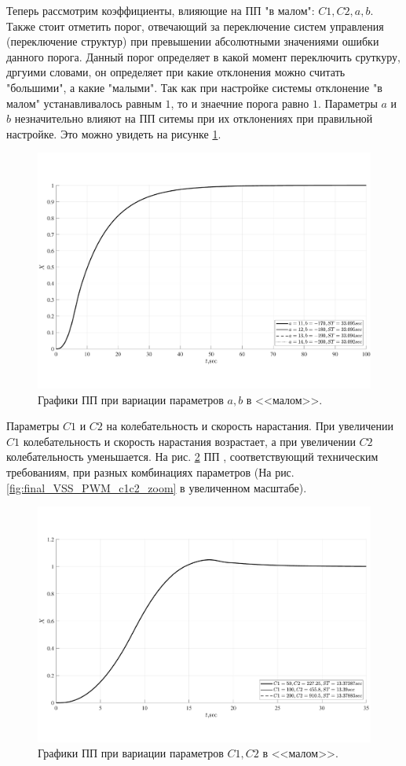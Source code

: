 Теперь рассмотрим коэффициенты, влияющие на ПП "в малом": $C1,C2,a,b$. Также стоит отметить порог, отвечающий за переключение систем управления (переключение структур) при превышении абсолютными значениями ошибки данного порога. Данный порог определяет в какой момент переключить сруткуру, дргуими словами, он определяет при какие отклонения можно считать "большими", а какие "малыми". Так как при настройке системы отклонение "в малом" устанавливалось равным $1$, то и знаечние порога равно $1$. 
Параметры $a$ и $b$ незначительно влияют на ПП ситемы  при их отклонениях при правильной настройке.
Это можно увидеть на рисунке \ref{fig:final_VSS_PWM_ab}. 
\begin{figure}[!h]\centering
	\includegraphics[width=1\linewidth]{images/final_VSS_PWM_ab}
	\caption{ Графики ПП при вариации параметров $a,b$ в <<малом>>.}\label{fig:final_VSS_PWM_ab}
\end{figure}
Параметры $C1$ и $C2$ на колебательность и скорость нарастания. При увеличении $C1$ колебательность и скорость нарастания возрастает, а при увеличении $C2$ колебательность уменьшается. На рис. \ref{fig:final_VSS_PWM_c1c2} ПП ,  соответствующий техническим требованиям, при разных комбинациях параметров (На рис.\ref{fig:final_VSS_PWM_c1c2_zoom} в увеличенном масштабе). 
\begin{figure}[!h]\centering
	\includegraphics[width=1\linewidth]{images/final_VSS_PWM_c1c2}
	\caption{ Графики ПП при вариации параметров $C1,C2$ в <<малом>>.}\label{fig:final_VSS_PWM_c1c2}
\end{figure}
